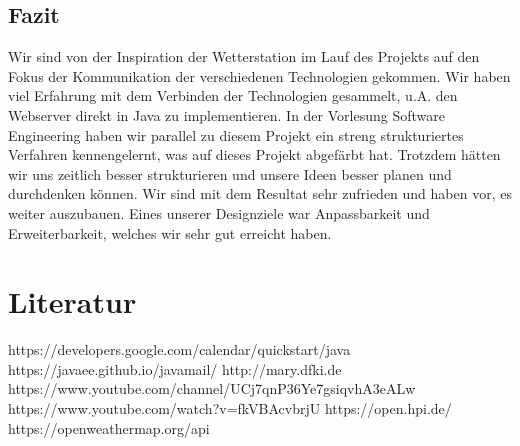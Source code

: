 \documentclass[11pt,a4paper]{article}
\begin{document}
\subsection{Fazit}
Wir sind von der Inspiration der Wetterstation im Lauf des Projekts auf den Fokus der Kommunikation der verschiedenen Technologien gekommen. Wir haben viel Erfahrung mit dem Verbinden der Technologien gesammelt, u.A. den Webserver direkt in Java zu implementieren. In der Vorlesung Software Engineering haben wir parallel zu diesem Projekt ein streng strukturiertes Verfahren kennengelernt, was auf dieses Projekt abgefärbt hat. Trotzdem hätten wir uns zeitlich besser strukturieren und unsere Ideen besser planen und durchdenken können.
Wir sind mit dem Resultat sehr zufrieden und haben vor, es weiter auszubauen. Eines unserer Designziele war Anpassbarkeit und Erweiterbarkeit, welches wir sehr gut erreicht haben.

\section{Literatur}
https://developers.google.com/calendar/quickstart/java \newline
https://javaee.github.io/javamail/ \newline
http://mary.dfki.de \newline
https://www.youtube.com/channel/UCj7qnP36Ye7gsiqvhA3eALw \newline
https://www.youtube.com/watch?v=fkVBAcvbrjU \newline
https://open.hpi.de/ \newline
https://openweathermap.org/api
%
%
\end{document}

